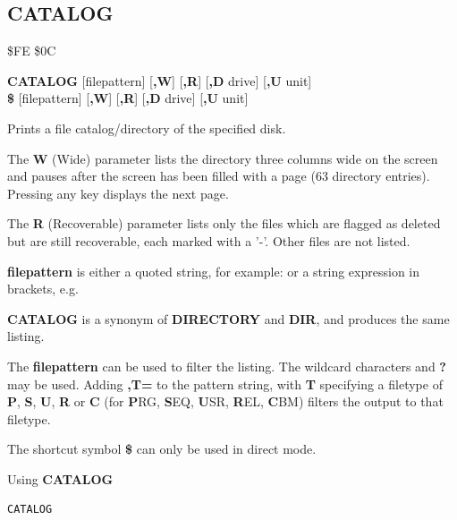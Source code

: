 \subsection{CATALOG}
\begin{description}[leftmargin=2cm,style=nextline]
\item [Token:]    \$FE \$0C

\item [Format:]   {\bf CATALOG} [filepattern] [{\bf,W}] [{\bf,R}] [{\bf,D} drive] [{\bf,U} unit] \\
		            {\bf\$} [filepattern] [{\bf,W}] [{\bf,R}] [{\bf,D} drive] [{\bf,U} unit]

\item [Usage:]    Prints a file catalog/directory of the specified disk.

                  The {\bf W} (Wide) parameter lists the directory three columns wide on the screen and pauses after the screen has been filled with a page (63 directory entries). Pressing any key displays the next page.

                  The {\bf R} (Recoverable) parameter lists only the files which are flagged as deleted but are still recoverable, each marked with a '-'. Other files are not listed.

                  {\bf filepattern} is either a quoted string, for example:  or a string expression in brackets, e.g. 

                  \drivedefinition

                  \unitdefinition

\item [Remarks:]  {\bf CATALOG} is a synonym of {\bf DIRECTORY} and {\bf DIR}, and produces the same listing.

                  The {\bf filepattern} can be used to filter the listing. The wildcard characters {\bf *} and {\bf ?} may be used. Adding {\bf ,T=} to the pattern string, with {\bf T} specifying a filetype of {\bf P}, {\bf S}, {\bf U}, {\bf R} or {\bf C} (for {\bf P}RG, {\bf S}EQ, {\bf U}SR, {\bf R}EL, {\bf C}BM) filters the output to that filetype.

                  The shortcut symbol {\bf \$} can only be used in direct mode.

\item [Examples:] Using {\bf CATALOG}

\begin{tcolorbox}[colback=black,coltext=white]
\verbatimfont{\codefont}
\begin{verbatim}
CATALOG
\end{verbatim}


\end{tcolorbox}
\end{description}
